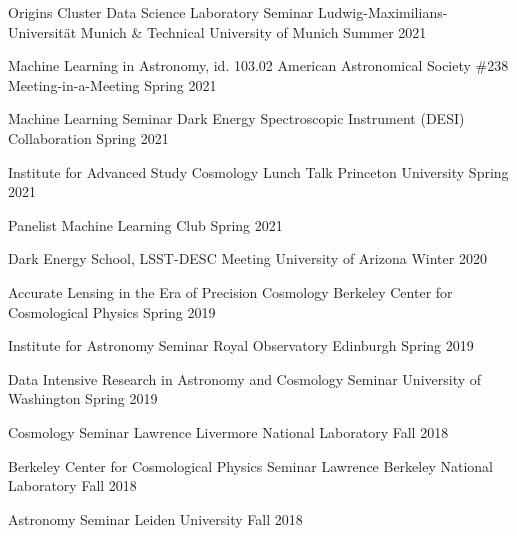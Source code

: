 \documentclass[12pt,letterpaper]{article}
\begin{document}
%
\clearpage

\nopagebreak\begin{list}{}{\malzlist}
\item \talk{}
	{Origins Cluster Data Science Laboratory Seminar}
	{Ludwig-Maximilians-Universit{\"a}t Munich \& Technical University of Munich}
	{Summer 2021}
\item {}
	{Machine Learning in Astronomy, id. 103.02}
	{American Astronomical Society \#238 Meeting-in-a-Meeting}
	{Spring 2021}
\item \talk{}
	{Machine Learning Seminar}
	{Dark Energy Spectroscopic Instrument (DESI) Collaboration}
	{Spring 2021}
\item \talk{}
	{Institute for Advanced Study Cosmology Lunch Talk}
	{Princeton University}
	{Spring 2021}
\item \talk{}
	{Panelist}
	{Machine Learning Club}
	{Spring 2021}
\item {}
	{Dark Energy School, LSST-DESC Meeting}
	{University of Arizona}
	{Winter 2020}
\item {}
  {Accurate Lensing in the Era of Precision Cosmology}
	{Berkeley Center for Cosmological Physics}
	{Spring 2019}
\item {}
  {Institute for Astronomy Seminar}
	{Royal Observatory Edinburgh}
	{Spring 2019}
\item {}
  {Data Intensive Research in Astronomy and Cosmology Seminar}
	{University of Washington}
	{Spring 2019}
\item {}
  {Cosmology Seminar}
	{Lawrence Livermore National Laboratory}
	{Fall 2018}
\item {}
  {Berkeley Center for Cosmological Physics Seminar}
	{Lawrence Berkeley National Laboratory}
	{Fall 2018}
\item {}
  {Astronomy Seminar}
	{Leiden University}
	{Fall 2018}
\item {}

\end{list}
\end{document}
